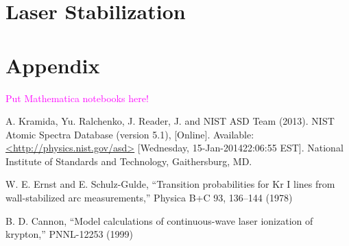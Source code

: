 \documentclass[prb,preprint]{revtex4-1}
\begin{document}
\section{Laser Stabilization}

\section{Appendix}

\textcolor{magenta}{Put Mathematica notebooks here!}


\begin{thebibliography}{2}

 A. Kramida, Yu. Ralchenko, J. Reader, J. and NIST ASD Team (2013). NIST Atomic Spectra Database (version 5.1), [Online]. Available: \url{<http://physics.nist.gov/asd>} [Wednesday, 15-Jan-201422:06:55 EST]. National Institute of Standards and Technology, Gaithersburg, MD.

 W. E. Ernst and E. Schulz-Gulde, ``Transition probabilities for Kr I lines from wall-stabilized arc measurements,'' Physica B+C 93, 136–144 (1978)

 B. D. Cannon, ``Model calculations of continuous-wave laser ionization of krypton,'' PNNL-12253 (1999)

\end{thebibliography}
\end{document}
